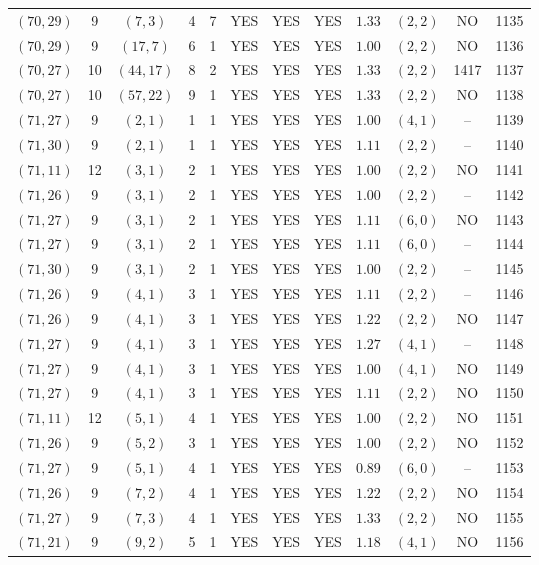 \begin{longtable}{|c|c|c|c|c|c|c|c|c|c|c|c|}
$(70,29)$ & 9 & $(7,3)$ & 4 & 7 & YES & YES & YES & $1.33$ & $(2,2)$ & NO & 1135\\
$(70,29)$ & 9 & $(17,7)$ & 6 & 1 & YES & YES & YES & $1.00$ & $(2,2)$ & NO & 1136\\
$(70,27)$ & 10 & $(44,17)$ & 8 & 2 & YES & YES & YES & $1.33$ & $(2,2)$ & 1417 & 1137\\
$(70,27)$ & 10 & $(57,22)$ & 9 & 1 & YES & YES & YES & $1.33$ & $(2,2)$ & NO & 1138\\
$(71,27)$ & 9 & $(2,1)$ & 1 & 1 & YES & YES & YES & $1.00$ & $(4,1)$ & -- & 1139\\
$(71,30)$ & 9 & $(2,1)$ & 1 & 1 & YES & YES & YES & $1.11$ & $(2,2)$ & -- & 1140\\
$(71,11)$ & 12 & $(3,1)$ & 2 & 1 & YES & YES & YES & $1.00$ & $(2,2)$ & NO & 1141\\
$(71,26)$ & 9 & $(3,1)$ & 2 & 1 & YES & YES & YES & $1.00$ & $(2,2)$ & -- & 1142\\
$(71,27)$ & 9 & $(3,1)$ & 2 & 1 & YES & YES & YES & $1.11$ & $(6,0)$ & NO & 1143\\
$(71,27)$ & 9 & $(3,1)$ & 2 & 1 & YES & YES & YES & $1.11$ & $(6,0)$ & -- & 1144\\
$(71,30)$ & 9 & $(3,1)$ & 2 & 1 & YES & YES & YES & $1.00$ & $(2,2)$ & -- & 1145\\
$(71,26)$ & 9 & $(4,1)$ & 3 & 1 & YES & YES & YES & $1.11$ & $(2,2)$ & -- & 1146\\
$(71,26)$ & 9 & $(4,1)$ & 3 & 1 & YES & YES & YES & $1.22$ & $(2,2)$ & NO & 1147\\
$(71,27)$ & 9 & $(4,1)$ & 3 & 1 & YES & YES & YES & $1.27$ & $(4,1)$ & -- & 1148\\
$(71,27)$ & 9 & $(4,1)$ & 3 & 1 & YES & YES & YES & $1.00$ & $(4,1)$ & NO & 1149\\
$(71,27)$ & 9 & $(4,1)$ & 3 & 1 & YES & YES & YES & $1.11$ & $(2,2)$ & NO & 1150\\
$(71,11)$ & 12 & $(5,1)$ & 4 & 1 & YES & YES & YES & $1.00$ & $(2,2)$ & NO & 1151\\
$(71,26)$ & 9 & $(5,2)$ & 3 & 1 & YES & YES & YES & $1.00$ & $(2,2)$ & NO & 1152\\
$(71,27)$ & 9 & $(5,1)$ & 4 & 1 & YES & YES & YES & $0.89$ & $(6,0)$ & -- & 1153\\
$(71,26)$ & 9 & $(7,2)$ & 4 & 1 & YES & YES & YES & $1.22$ & $(2,2)$ & NO & 1154\\
$(71,27)$ & 9 & $(7,3)$ & 4 & 1 & YES & YES & YES & $1.33$ & $(2,2)$ & NO & 1155\\
$(71,21)$ & 9 & $(9,2)$ & 5 & 1 & YES & YES & YES & $1.18$ & $(4,1)$ & NO & 1156\\

\end{longtable}
